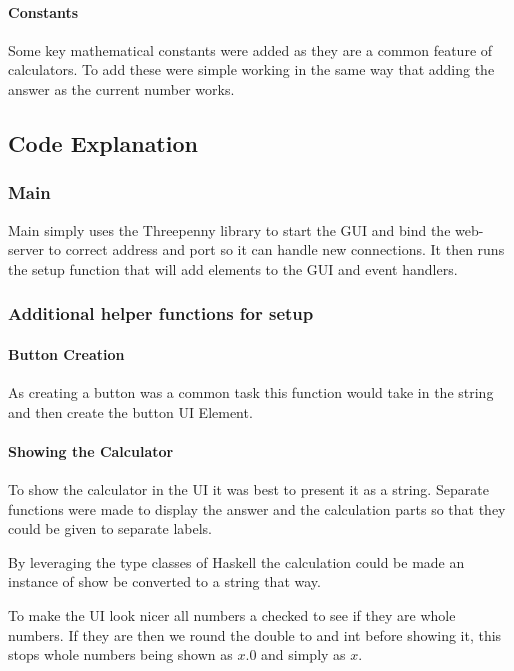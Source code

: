 \documentclass[a4paper]{article}
\begin{document}
\paragraph{Constants}
Some key mathematical constants were added as they are a common feature of calculators.
To add these were simple working in the same way that adding the answer as the current number works.


\subsection{Code Explanation}
\subsubsection{Main}
Main simply uses the Threepenny library to start the GUI and bind the web-server to correct address and port so it can handle new connections.
It then runs the setup function that will add elements to the GUI and event handlers.

\subsubsection{Additional helper functions for setup}
\paragraph{Button Creation}
As creating a button was a common task this function would take in the string and then create the button UI Element.


\paragraph{Showing the Calculator}
To show the calculator in the UI it was best to present it as a string.
Separate functions were made to display the answer and the calculation parts so that they could be given to separate labels.
\par
By leveraging the type classes of Haskell the calculation could be made an instance of show be converted to a string that way.
\par
To make the UI look nicer all numbers a checked to see if they are whole numbers.
If they are then we round the double to and int before showing it, this stops whole numbers being shown as \( x.0\) and simply as \( x\).

\end{document}
